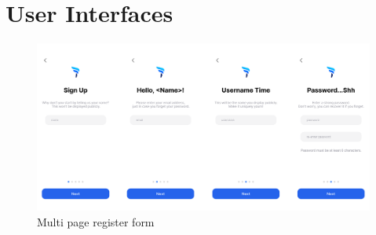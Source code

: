 \documentclass[12pt, titlepage]{article}
\begin{document}
	
	\section{User Interfaces}

  \begin{figure}[H]
		\centering
		\includegraphics[width=\linewidth,keepaspectratio]{register_stack}
		\caption{Multi page register form}
	\end{figure}
\end{document}
